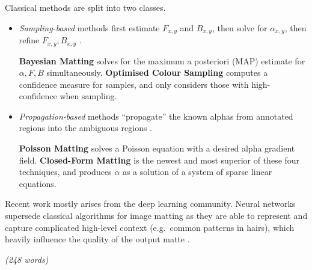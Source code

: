 \documentclass{article}
\begin{document}
Classical methods are split into two classes.
\begin{itemize}
    \item \emph{Sampling-based} methods first estimate $F_{x,y}$ and $B_{x,y}$, then solve for $\alpha_{x,y}$, then refine $F_{x,y},B_{x,y}$ \cite{dim-paper}.

    \textbf{Bayesian Matting} \cite{bayesian-matting} solves for the maximum a posteriori (MAP) estimate for $\alpha,F,B$ simultaneously. \textbf{Optimised Colour Sampling} \cite{robust-matting} computes a confidence measure for samples, and only considers those with high-confidence when sampling.
    \item \emph{Propagation-based} methods ``propagate'' the known alphas from annotated regions into the ambiguous regions \cite{dim-paper}.

    \textbf{Poisson Matting} \cite{poisson-matting} solves a Poisson equation with a desired alpha gradient field. \textbf{Closed-Form Matting} \cite{closed-form-matting} is the newest and most superior of these four techniques, and produces $\alpha$ as a solution of a system of sparse linear equations.
\end{itemize}

Recent work mostly arises from the deep learning community. Neural networks supersede classical algorithms for image matting as they are able to  represent and capture complicated high-level context (e.g.\ common patterns in hairs), which heavily influence the quality of the output matte \cite{sota-composition-1k}.

\emph{(248 words)}

%




\end{document}
